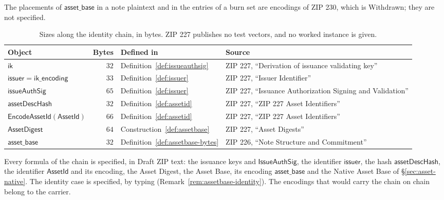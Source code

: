 \documentclass[11pt,a4paper]{article}
\theoremstyle{definition}
\begin{document}
The placements of $\mathsf{asset\_base}$ in a note plaintext and in the
entries of a burn set are encodings of ZIP 230, which is Withdrawn; they are
not specified.

\begin{table}[ht]
\centering\footnotesize\setlength{\tabcolsep}{5pt}
\begin{tabular}{@{}lrll@{}}
\toprule
Object & Bytes & Defined in & Source \\
\midrule
$\mathsf{ik}$ & $32$ & Definition~\ref{def:issueauthsig}
  & ZIP 227, ``Derivation of issuance validating key'' \\
$\mathsf{issuer} = \mathsf{ik\_encoding}$ & $33$
  & Definition~\ref{def:issuer} & ZIP 227, ``Issuer Identifier'' \\
$\mathsf{issueAuthSig}$ & $65$ & Definition~\ref{def:issuer}
  & ZIP 227, ``Issuance Authorization Signing and Validation'' \\
$\mathsf{assetDescHash}$ & $32$ & Definition~\ref{def:assetid}
  & ZIP 227, ``ZIP 227 Asset Identifiers'' \\
$\mathsf{EncodeAssetId}(\mathsf{AssetId})$ & $66$
  & Definition~\ref{def:assetid} & ZIP 227, ``ZIP 227 Asset Identifiers'' \\
$\mathsf{AssetDigest}$ & $64$ & Construction~\ref{def:assetbase}
  & ZIP 227, ``Asset Digests'' \\
$\mathsf{asset\_base}$ & $32$ & Definition~\ref{def:assetbase-bytes}
  & ZIP 226, ``Note Structure and Commitment'' \\
\bottomrule
\end{tabular}
\caption{Sizes along the identity chain, in bytes. ZIP 227 publishes no test
vectors, and no worked instance is given.}
\label{tab:identity-sizes}
\end{table}

Every formula of the chain is specified, in Draft ZIP text: the issuance
keys and $\mathsf{IssueAuthSig}$, the identifier $\mathsf{issuer}$, the hash
$\mathsf{assetDescHash}$, the identifier $\mathsf{AssetId}$ and its encoding,
the Asset Digest, the Asset Base, its encoding $\mathsf{asset\_base}$ and the
Native Asset Base of \S\ref{sec:asset-native}. The identity case is
specified, by typing (Remark~\ref{rem:assetbase-identity}). The
encodings that would carry the chain on chain belong to the carrier.
\end{document}
